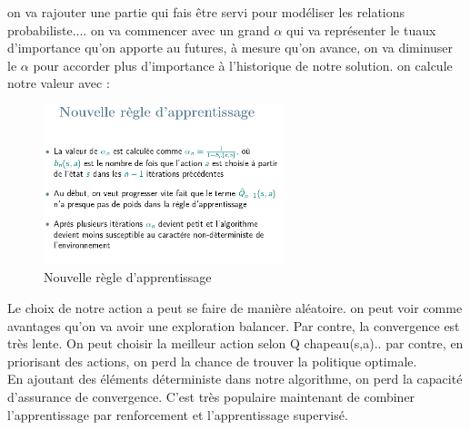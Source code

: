 \documentclass[oneside]{book}
\begin{document}
on va rajouter une partie qui fais être servi pour modéliser les relations probabiliste.... on va commencer avec un grand $\alpha$ qui va représenter le tuaux d'importance qu'on apporte au futures, à mesure qu'on avance, on va diminuser le $\alpha$ pour accorder plus d'importance à l'historique de notre solution. on calcule notre valeur avec :\\

\begin{figure}[!ht]
\centering
\includegraphics[width = 7cm]{slide47.png}
\caption{Nouvelle règle d'apprentissage}
\end{figure}

Le choix de notre action a peut se faire de manière aléatoire. on peut voir comme avantages qu'on va avoir une exploration balancer. Par contre, la convergence est très lente. On peut choisir la meilleur action selon Q chapeau(s,a).. par contre, en priorisant des actions, on perd la chance de trouver la politique optimale. \\

En ajoutant des éléments déterministe dans notre algorithme, on perd la capacité d'assurance de convergence. C'est très populaire maintenant de combiner l'apprentissage par renforcement et l'apprentissage supervisé.\\

 
\end{document}
